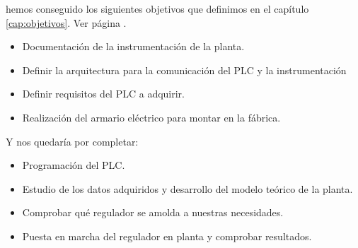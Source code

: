  hemos conseguido los siguientes objetivos que definimos en el capítulo \ref{cap:objetivos}. Ver página \pageref{Listado_objetivos}.

\begin{itemize}
	\item Documentación de la instrumentación de la planta.
	\item Definir la arquitectura para la comunicación del PLC y la instrumentación
	\item Definir requisitos del PLC a adquirir.
	\item Realización del armario eléctrico para montar en la fábrica.
\end{itemize}

Y nos quedaría por completar:

\begin{itemize}
	\item Programación del PLC.
	\item Estudio de los datos adquiridos y desarrollo del modelo teórico de la planta.
	\item Comprobar qué regulador se amolda a nuestras necesidades.
	\item Puesta en marcha del regulador en planta y comprobar resultados.
\end{itemize}